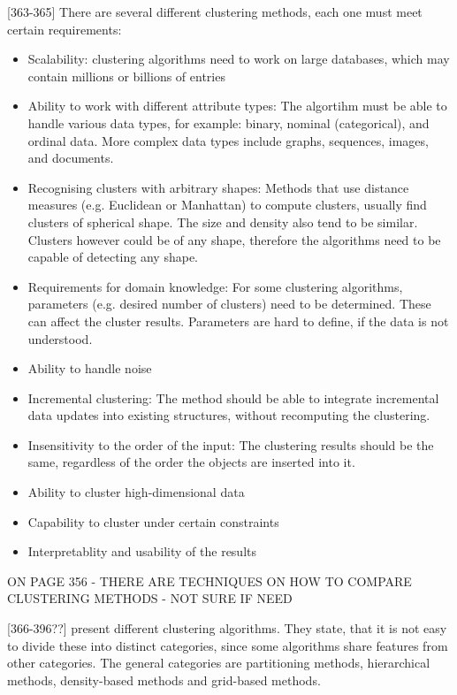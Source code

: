 \textcite{han2011data}[363-365]
There are several different clustering methods, each one must meet certain requirements:
\begin{itemize}
  \item Scalability: clustering algorithms need to work on large databases, which may contain millions or billions of entries
  \item Ability to work with different attribute types: The algortihm must be able to handle various data types, for example: binary, nominal (categorical), and ordinal data. More complex data types include graphs, sequences, images, and documents.
  \item Recognising clusters with arbitrary shapes: Methods that use distance measures (e.g. Euclidean or Manhattan) to compute clusters, usually find clusters of spherical shape. The size and density also tend to be similar. Clusters however could be of any shape, therefore the algorithms need to be capable of detecting any shape.
  \item Requirements for domain knowledge: For some clustering algorithms, parameters (e.g. desired number of clusters) need to be determined. These can affect the cluster results. Parameters are hard to define, if the data is not understood.
  \item Ability to handle noise
  \item Incremental clustering: The method should be able to integrate incremental data updates into existing structures, without recomputing the clustering.
  \item Insensitivity to the order of the input: The clustering results should be the same, regardless of the order the objects are inserted into it.
  \item Ability to cluster high-dimensional data %
  \item Capability to cluster under certain constraints %
  \item Interpretablity and usability of the results
\end{itemize}

ON PAGE 356 - THERE ARE TECHNIQUES ON HOW TO COMPARE CLUSTERING METHODS - NOT SURE IF NEED

\textcite{han2011data}[366-396??] present different clustering algorithms. They state, that it is not easy to divide these into distinct categories, since some algorithms share features from other categories. The general categories are partitioning methods, hierarchical methods, density-based methods and grid-based methods.

